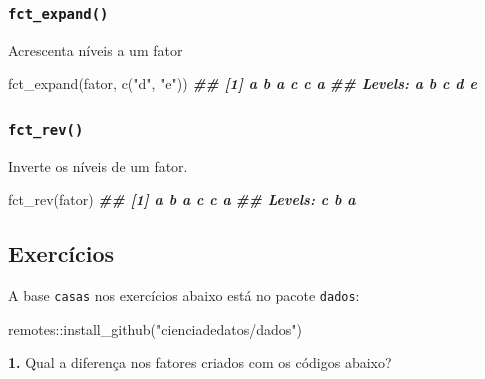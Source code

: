\documentclass[
]{book}
\newenvironment{Shaded}{\begin{snugshade}}{\end{snugshade}}
\newcommand{\DocumentationTok}[1]{\textcolor[rgb]{0.56,0.35,0.01}{\textbf{\textit{#1}}}}
\newcommand{\FunctionTok}[1]{\textcolor[rgb]{0.00,0.00,0.00}{#1}}
\newcommand{\NormalTok}[1]{#1}
\newcommand{\SpecialCharTok}[1]{\textcolor[rgb]{0.00,0.00,0.00}{#1}}
\newcommand{\StringTok}[1]{\textcolor[rgb]{0.31,0.60,0.02}{#1}}
\begin{document}
\hypertarget{fct_expand}{%
\subsubsection*{\texorpdfstring{\texttt{fct\_expand()}}{fct\_expand()}}\label{fct_expand}}

Acrescenta níveis a um fator

\begin{Shaded}
\begin{Highlighting}[]
\FunctionTok{fct\_expand}\NormalTok{(fator, }\FunctionTok{c}\NormalTok{(}\StringTok{"d"}\NormalTok{, }\StringTok{"e"}\NormalTok{))}
\DocumentationTok{\#\# [1] a b a c c a}
\DocumentationTok{\#\# Levels: a b c d e}
\end{Highlighting}
\end{Shaded}

\hypertarget{fct_rev}{%
\subsubsection*{\texorpdfstring{\texttt{fct\_rev()}}{fct\_rev()}}\label{fct_rev}}

Inverte os níveis de um fator.

\begin{Shaded}
\begin{Highlighting}[]
\FunctionTok{fct\_rev}\NormalTok{(fator)}
\DocumentationTok{\#\# [1] a b a c c a}
\DocumentationTok{\#\# Levels: c b a}
\end{Highlighting}
\end{Shaded}

\hypertarget{exercuxedcios-21}{%
\subsection{Exercícios}\label{exercuxedcios-21}}

A base \texttt{casas} nos exercícios abaixo está no pacote \texttt{dados}:

\begin{Shaded}
\begin{Highlighting}[]
\NormalTok{remotes}\SpecialCharTok{::}\FunctionTok{install\_github}\NormalTok{(}\StringTok{"cienciadedatos/dados"}\NormalTok{)}
\end{Highlighting}
\end{Shaded}

\textbf{1.} Qual a diferença nos fatores criados com os códigos abaixo?
\end{document}
